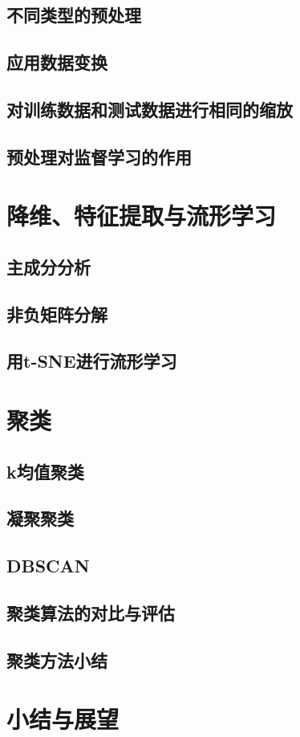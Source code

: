 \subsection{不同类型的预处理}
\subsection{应用数据变换}
\subsection{对训练数据和测试数据进行相同的缩放}
\subsection{预处理对监督学习的作用}
\section{降维、特征提取与流形学习}
\subsection{主成分分析}
\subsection{非负矩阵分解}
\subsection{用t-SNE进行流形学习}
\section{聚类}
\subsection{k均值聚类}
\subsection{凝聚聚类}
\subsection{DBSCAN}
\subsection{聚类算法的对比与评估}
\subsection{聚类方法小结}
\section{小结与展望}